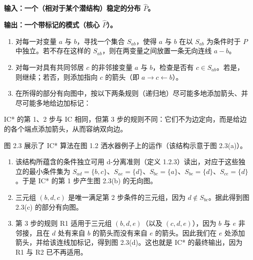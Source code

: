 \begin{techpoint}[IC* 算法（含潜变量的归纳因果）]
\bfseries 输入：\normalfont 一个（相对于某个潜结构）稳定的分布 $\hat{P}$。

\bfseries 输出：\normalfont 一个带标记的模式（核心 $\hat{P}$）。

\begin{enumerate}[label=\arabic*.,leftmargin=1.8em]
\item 对每一对变量 $a$ 与 $b$，寻找一个集合 $S_{ab}$，使得 $a$ 与 $b$ 在以 $S_{ab}$ 为条件时于 $\hat{P}$ 中独立。若不存在这样的 $S_{ab}$，则在两变量之间放置一条无向连线 $a-b$。
\item 对每一对具有共同邻居 $c$ 的非邻接变量 $a$ 与 $b$，检查是否有 $c\in S_{ab}$。若是，则继续；若否，则添加指向 $c$ 的箭头（即 $a\to c\leftarrow b$）。
\item 在所得的部分有向图中，按以下两条规则（递归地）尽可能多地添加箭头、并尽可能多地给边加标记：
\end{enumerate}
\end{techpoint}

IC* 的第 1、2 步与 IC 相同，但第 3 步的规则不同：它们不为边定向，而是给边的各个端点添加箭头，从而容纳双向边。

图 2.3 展示了 IC* 算法在图 1.2 洒水器例子上的运作（该结构示意于图 2.3(a)）。

\begin{enumerate}[label=\arabic*.,leftmargin=1.8em]
\item 该结构所蕴含的条件独立可用 d-分离准则（定义 1.2.3）读出，对应于这些独立的最小条件集为 $S_{ad}=\{b,c\}$、$S_{ae}=\{d\}$、$S_{bc}=\{a\}$、$S_{be}=\{d\}$、$S_{ce}=\{d\}$。于是 IC* 的第 1 步产生图 2.3(b) 的无向图。
\item 三元组 $(b,d,c)$ 是唯一满足第 2 步条件的三元组，因为 $d\notin S_{bc}$。据此得到图 2.3(c) 的部分有向图。
\item 第 3 步的规则 R1 适用于三元组 $(b,d,e)$（以及 $(c,d,e)$），因为 $b$ 与 $e$ 非邻接，且在 $d$ 处有来自 $b$ 的箭头而没有来自 $e$ 的箭头。因此我们在 $e$ 处添加箭头，并给该连线加标记，得到图 2.3(d)。这也就是 IC* 的最终输出，因为 R1 与 R2 已不再适用。
\end{enumerate}

